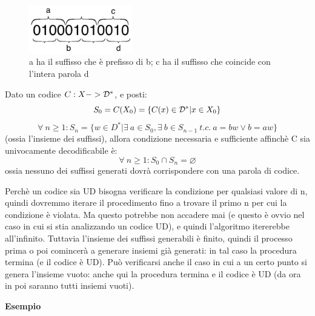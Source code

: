 \begin{figure}[htbp]
\begin{center}
	\includegraphics[width=0.4\textwidth]{img/ud.pdf}
\caption{a ha il suffisso che è prefisso di b; c ha il suffisso che coincide con l'intera parola d}
\label{fig:0018}
\end{center}
\end{figure}

\begin{teorema}
Dato un codice \(C: X -> \mathcal{D}^*\), e posti:
\[S_0 = C(X_0) = \{C(x) \in \mathcal{D}^* | x \in X_0\}\]
\[\forall \ n \geq 1 : S_n = \{w \in D^* | \exists \ a \in S_0, \exists \ b \in S_{n-1} \ t.c. \  a = bw \lor b = aw\}\]
(ossia l'insieme dei suffissi), allora condizione necessaria e sufficiente affinchè C sia univocamente decodificabile è:
\[\forall \ n \geq 1 : S_0 \cap S_n = \varnothing\]
ossia nessuno dei suffissi generati dovrà corrispondere con una parola di codice.
\end{teorema}

Perchè un codice sia UD bisogna verificare la condizione per qualsiasi valore di n, quindi dovremmo iterare il procedimento fino a trovare il primo n per cui la condizione è violata. Ma questo potrebbe non accadere mai (e questo è ovvio nel caso in cui si stia analizzando un codice UD), e quindi l'algoritmo itererebbe all'infinito. Tuttavia l'insieme dei suffissi generabili è finito, quindi il processo prima o poi comincerà a generare insiemi già generati: in tal caso la procedura termina (e il codice è UD). Può verificarsi anche il caso in cui a un certo punto si genera l'insieme vuoto: anche qui la procedura termina e il codice è UD (da ora in poi saranno tutti insiemi vuoti).

\bigskip
\noindent
\textbf{Esempio}

